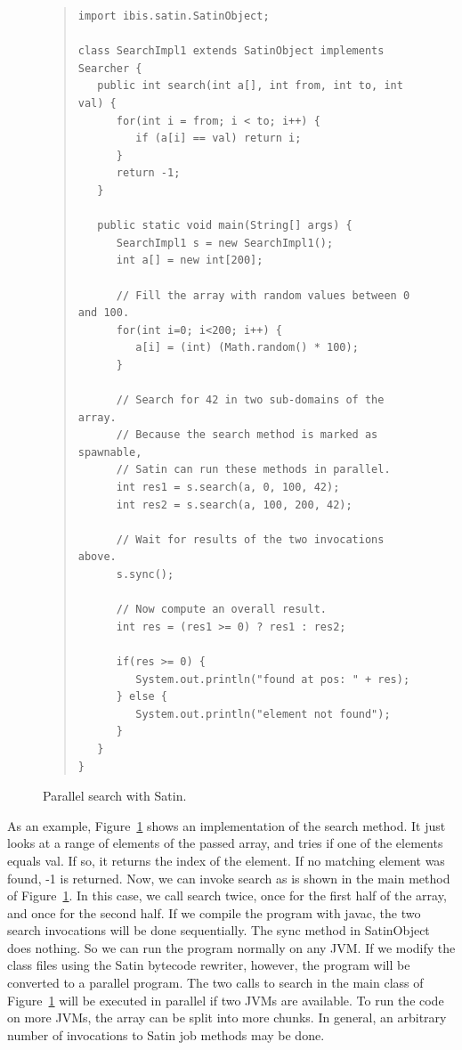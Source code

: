 \documentclass[10pt]{article}
\begin{document}
\begin{figure}[t!]
\small{
\begin{quote}
\begin{verbatim}
import ibis.satin.SatinObject;

class SearchImpl1 extends SatinObject implements Searcher {
   public int search(int a[], int from, int to, int val) {
      for(int i = from; i < to; i++) {
         if (a[i] == val) return i;
      }
      return -1;
   }

   public static void main(String[] args) {
      SearchImpl1 s = new SearchImpl1();
      int a[] = new int[200];

      // Fill the array with random values between 0 and 100.
      for(int i=0; i<200; i++) {
         a[i] = (int) (Math.random() * 100);
      }

      // Search for 42 in two sub-domains of the array.
      // Because the search method is marked as spawnable,
      // Satin can run these methods in parallel.
      int res1 = s.search(a, 0, 100, 42);
      int res2 = s.search(a, 100, 200, 42);

      // Wait for results of the two invocations above.
      s.sync();

      // Now compute an overall result.
      int res = (res1 >= 0) ? res1 : res2;

      if(res >= 0) {
         System.out.println("found at pos: " + res);
      } else {
         System.out.println("element not found");
      }
   }
}
\end{verbatim}
\end{quote}
}
\caption{Parallel search with Satin.}
\label{satin-search-fig}
\end{figure}

As an example, Figure~\ref{satin-search-fig} shows an implementation of the search
method. It just looks at a range of elements of the passed array, and
tries if one of the elements equals val. If so, it returns the index
of the element. If no matching element was found, -1 is returned.
Now, we can invoke search as is shown in the main method of Figure~\ref{satin-search-fig}.
In this case, we call search twice, once for the first half of the
array, and once for the second half. If we compile the program with
javac, the two search invocations will be done sequentially. The sync
method in SatinObject does nothing. So we can run the program normally
on any JVM.  If we modify the class files using the Satin bytecode
rewriter, however, the program will be converted to a parallel
program.  The two calls to search in the main class of Figure~\ref{satin-search-fig} will
be executed in parallel if two JVMs are available. To run the code on
more JVMs, the array can be split into more chunks. In general, an
arbitrary number of invocations to Satin job methods may be done.
\end{document}
